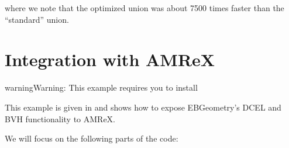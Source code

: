 \documentclass[letterpaper,10pt,english]{sphinxmanual}
\begin{document}
\sphinxAtStartPar
where we note that the optimized union was about 7500 times faster than the “standard” union.

\sphinxstepscope


\section{Integration with AMReX}
\label{\detokenize{Example_AMReX:integration-with-amrex}}\label{\detokenize{Example_AMReX::doc}}
\begin{sphinxadmonition}{warning}{Warning:}
\sphinxAtStartPar
This example requires you to install 
\end{sphinxadmonition}

\sphinxAtStartPar
This example is given in  and shows how to expose EBGeometry’s DCEL and BVH functionality to AMReX.

\sphinxAtStartPar
We will focus on the following parts of the code:
\end{document}
